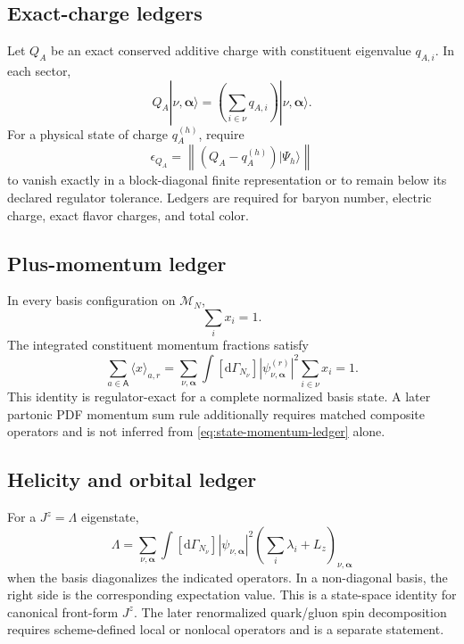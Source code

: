 \documentclass[11pt]{article}
\newcommand{\dd}{\mathrm{d}}
\newcommand{\cM}{\mathcal M}
\newcommand{\norm}[1]{\left\lVert#1\right\rVert}
\begin{document}
\subsection{Exact-charge ledgers}

Let \(Q_A\) be an exact conserved additive charge with constituent eigenvalue
\(q_{A,i}\).  In each sector,
\begin{equation}
 Q_A|\nu,\bm\alpha\rangle
 =\left(\sum_{i\in\nu}q_{A,i}\right)
 |\nu,\bm\alpha\rangle.
\label{eq:additive-charge}
\end{equation}
For a physical state of charge \(q_A^{(h)}\), require
\begin{equation}
 \epsilon_{Q_A}
 =\norm{(Q_A-q_A^{(h)})|\Psi_h\rangle}
\label{eq:charge-defect}
\end{equation}
to vanish exactly in a block-diagonal finite representation or to remain
below its declared regulator tolerance.  Ledgers are required for baryon
number, electric charge, exact flavor charges, and total color.

\subsection{Plus-momentum ledger}

In every basis configuration on \(\cM_N\),
\begin{equation}
 \sum_i x_i=1.
\label{eq:configuration-momentum-ledger}
\end{equation}
The integrated constituent momentum fractions satisfy
\begin{equation}
 \sum_{a\in\mathsf A}
 \langle x\rangle_{a,r}
 =\sum_{\nu,\bm\alpha}
 \int[\dd\Gamma_{N_\nu}]
 |\psi_{\nu,\bm\alpha}^{(r)}|^2
 \sum_{i\in\nu}x_i
 =1.
\label{eq:state-momentum-ledger}
\end{equation}
This identity is regulator-exact for a complete normalized basis state.  A
later partonic PDF momentum sum rule additionally requires matched composite
operators and is not inferred from \cref{eq:state-momentum-ledger} alone.

\subsection{Helicity and orbital ledger}

For a \(J^z=\Lambda\) eigenstate,
\begin{equation}
 \Lambda
 =\sum_{\nu,\bm\alpha}
 \int[\dd\Gamma_{N_\nu}]
 |\psi_{\nu,\bm\alpha}|^2
 \left(\sum_i\lambda_i+L_z\right)_{\nu,\bm\alpha}
\label{eq:state-jz-ledger}
\end{equation}
when the basis diagonalizes the indicated operators.  In a non-diagonal
basis, the right side is the corresponding expectation value.  This is a
state-space identity for canonical front-form \(J^z\).  The later
renormalized quark/gluon spin decomposition requires scheme-defined local or
nonlocal operators and is a separate statement.
\end{document}

